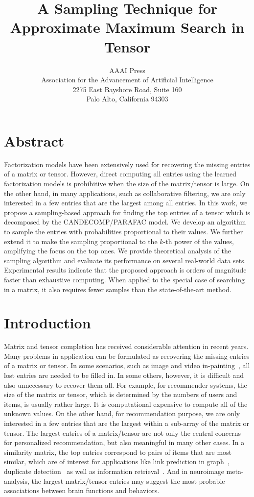 \documentclass[letterpaper]{article}
\title{A Sampling Technique for Approximate Maximum Search in Tensor}
\author{AAAI Press\\
Association for the Advancement of Artificial Intelligence\\
2275 East Bayshore Road, Suite 160\\
Palo Alto, California 94303\\
}
\begin{document}
\maketitle
\section{Abstract}
Factorization models have been extensively used for
recovering the missing entries of a matrix or tensor.
However, direct computing all entries
using the learned factorization models is prohibitive
when the size of the matrix/tensor is large.
On the other hand, in many applications,
such as collaborative filtering,
we are only interested in a few entries that are the largest among all entries.
In this work, we propose a sampling-based approach for finding the top entries of a tensor
which is decomposed by the CANDECOMP/PARAFAC model.
We develop an algorithm to sample the entries with probabilities proportional to their values.
We further extend it to make the sampling proportional to the $k$-th power of the values,
amplifying the focus on the top ones.
We provide theoretical analysis of the sampling algorithm and evaluate its performance on several real-world data sets.
Experimental results indicate that the proposed approach is orders of magnitude faster than exhaustive computing.
When applied to the special case of searching in a matrix,
it also requires fewer samples than the state-of-the-art method.

\section{Introduction}
Matrix and tensor completion has received considerable attention in recent years.
Many problems in application can be formulated
as recovering the missing entries of a matrix or tensor.
In some scenarios, such as image and video in-painting~\cite{Ankita14},
all lost entries are needed to be filled in.
In some others, however, it is difficult and also unnecessary to recover them all.
For example, for recommender systems, the size of the matrix or tensor,
which is determined by the numbers of users and items, is usually rather large.
It is computational expensive to compute all of the unknown values.
On the other hand, for recommendation purpose,
we are only interested in a few entries that are the largest within a sub-array of the matrix or tensor.
The largest entries of a matrix/tensor are not only the central concerns for personalized recommendation,
but also meaningful in many other cases.
In a similarity matrix, the top entries correspond to pairs of items that are most similar,
which are of interest for applications like link prediction in graph~\cite{LibenNowell07},
duplicate detection~\cite{Ke2010} as well as information retrieval~\cite{Salton03IR}.
And in neuroimage meta-analysis,
the largest matrix/tensor entries may suggest the most probable associations between brain functions and behaviors.
\end{document}

